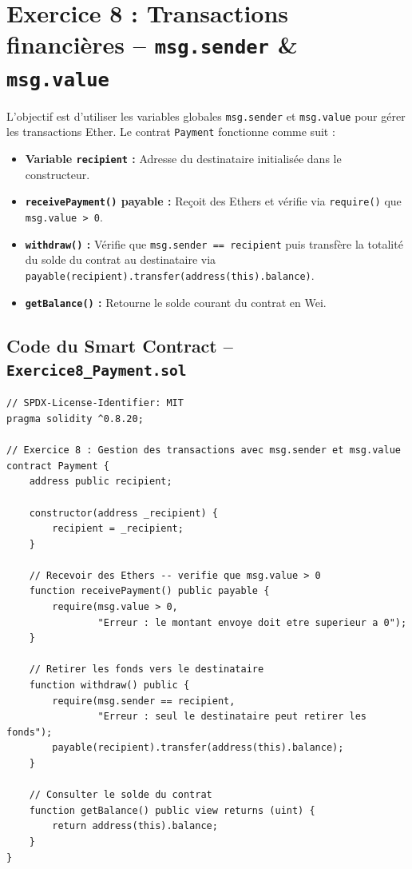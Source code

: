 \documentclass[12pt,a4paper]{report}
\begin{document}
\newpage

\section{Exercice 8 : Transactions financières -- \texttt{msg.sender} \& \texttt{msg.value}}
L'objectif est d'utiliser les variables globales \texttt{msg.sender} et \texttt{msg.value}
pour gérer les transactions Ether. Le contrat \texttt{Payment} fonctionne comme suit :

\begin{itemize}
    \item \textbf{Variable \texttt{recipient} :} Adresse du destinataire initialisée dans le constructeur.
    \item \textbf{\texttt{receivePayment()} payable :} Reçoit des Ethers et vérifie via
          \texttt{require()} que \texttt{msg.value > 0}.
    \item \textbf{\texttt{withdraw()} :} Vérifie que \texttt{msg.sender == recipient} puis
          transfère la totalité du solde du contrat au destinataire via
          \texttt{payable(recipient).transfer(address(this).balance)}.
    \item \textbf{\texttt{getBalance()} :} Retourne le solde courant du contrat en Wei.
\end{itemize}

\subsection{Code du Smart Contract -- \texttt{Exercice8\_Payment.sol}}
\begin{lstlisting}[language=Solidity, caption={Contrat Payment.sol -- msg.sender et msg.value}]
// SPDX-License-Identifier: MIT
pragma solidity ^0.8.20;

// Exercice 8 : Gestion des transactions avec msg.sender et msg.value
contract Payment {
    address public recipient;

    constructor(address _recipient) {
        recipient = _recipient;
    }

    // Recevoir des Ethers -- verifie que msg.value > 0
    function receivePayment() public payable {
        require(msg.value > 0,
                "Erreur : le montant envoye doit etre superieur a 0");
    }

    // Retirer les fonds vers le destinataire
    function withdraw() public {
        require(msg.sender == recipient,
                "Erreur : seul le destinataire peut retirer les fonds");
        payable(recipient).transfer(address(this).balance);
    }

    // Consulter le solde du contrat
    function getBalance() public view returns (uint) {
        return address(this).balance;
    }
}
\end{lstlisting}
\end{document}
